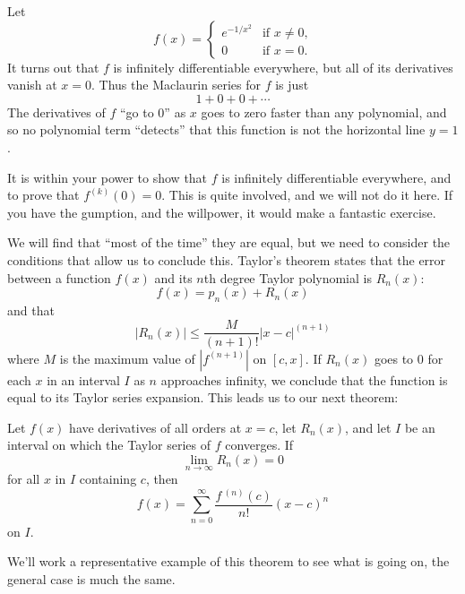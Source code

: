 \documentclass{ximera}
\begin{document}
\begin{example}  %
	Let 
	\[
	f(x) = \begin{cases}
		e^{-1/x^2} &\text{if $x \neq 0$,}\\
		0 &\text{if $x = 0$.}
	\end{cases}
	\]
	It turns out that $f$ is infinitely differentiable everywhere,
        but all of its derivatives vanish at $x=0$. Thus the Maclaurin series for $f$ is just
        \[
        1 + 0 + 0+ \cdots
        \]
        The derivatives of $f$ ``go to $0$'' as $x$ goes to zero
        faster than any polynomial, and so no polynomial term
        ``detects'' that this function is not the horizontal line
        $y=1$.

        It is within your power to show that $f$ is infinitely
        differentiable everywhere, and to prove that $f^{(k)}(0) = 0$.
        This is quite involved, and we will not do it here.  If you
        have the gumption, and the willpower, it would make a
        fantastic exercise.
\end{example}

We will find that ``most of the time'' they are equal, but we need to
consider the conditions that allow us to conclude this.  Taylor's
theorem states that the error between a function $f(x)$ and its $n$th
degree Taylor polynomial is $R_n(x)$:
\[
f(x) = p_n(x) + R_n(x)
\]
and that 
\[
\left|R_n(x)\right| \leq \frac{M}{(n+1)!}|x-c|^{(n+1)}
\]
where $M$ is the maximum value of $|f^{(n+1)}|$ on $[c,x]$.  If
$R_n(x)$ goes to $0$ for each $x$ in an interval $I$ as $n$ approaches
infinity, we conclude that the function is equal to its Taylor series
expansion. This leads us to our next theorem:

\begin{theorem}
Let $f(x)$ have derivatives of all orders at $x=c$, let $R_n(x)$, and
let $I$ be an interval on which the Taylor series of $f$ converges.
If
\[
\lim_{n\to\infty} R_n(x) = 0
\]
for all $x$ in $I$ containing $c$, then
\[
f(x) = \sum_{n=0}^\infty \frac{f\,^{(n)}(c)}{n!}(x-c)^n
\]
on $I$.
\end{theorem}

We'll work a representative example of this theorem to see what is
going on, the general case is much the same.
\end{document}
